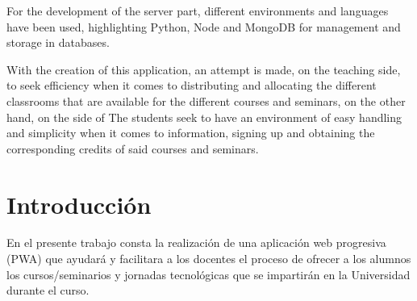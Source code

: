 \documentclass[a4paper, 12pt]{book}
\begin{document}
	For the development of the server part, different environments and languages ​​have been used, highlighting Python, Node and MongoDB for management and storage in databases.

	With the creation of this application, an attempt is made, on the teaching side, to seek efficiency when it comes to distributing and allocating the different classrooms that are available for the different courses and seminars, on the other hand, on the side of The students seek to have an environment of easy handling and simplicity when it comes to information, signing up and obtaining the corresponding credits of said courses and seminars.




\tableofcontents 
\cleardoublepage
\listoffigures %



\cleardoublepage
\chapter{Introducción}
\label{sec:intro} %

En el presente trabajo consta la realización de una aplicación web progresiva (PWA) que ayudará y facilitara a los docentes el proceso de ofrecer a los alumnos los cursos/seminarios y jornadas tecnológicas que se impartirán en la Universidad durante el curso.
\end{document}
